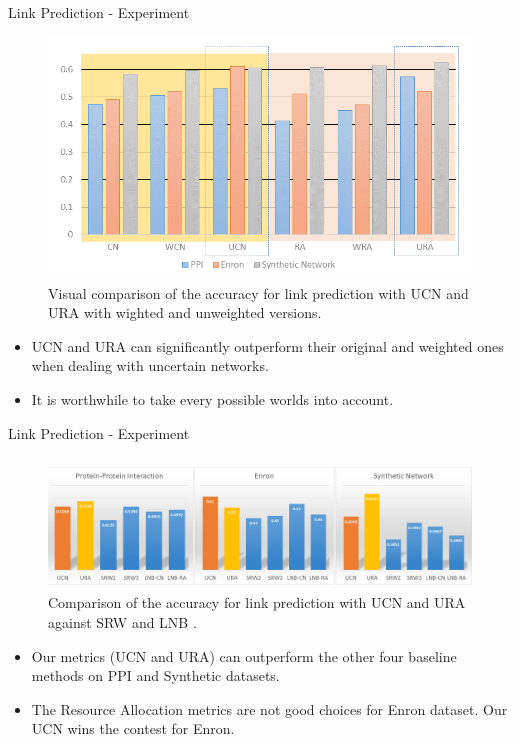 \documentclass[9pt]{beamer}
\begin{document}
\begin{frame}{Link Prediction - Experiment}

\begin{figure}
\centering
\includegraphics[scale = 0.8]{Result-Fig1.png}
\caption{Visual comparison of the accuracy for link prediction with UCN and URA with wighted and unweighted versions.}
\label{example}
\end{figure}
\begin{itemize}
\item UCN and URA can significantly outperform their original and weighted ones when dealing with uncertain networks. 
\item It is worthwhile to take every possible worlds into account.
\end{itemize}

\end{frame}




\begin{frame}{Link Prediction - Experiment}

\begin{figure}
\centering
\includegraphics[scale = 0.6]{Results-Fig2.png}
\caption{Comparison of the accuracy for link prediction with UCN and URA against SRW \cite{liu2010link} and LNB \cite{liu2011link}.}
\label{example}
\end{figure}

\begin{itemize}
\item Our metrics (UCN and URA) can outperform the other four baseline methods on PPI and Synthetic datasets. 
\item The Resource Allocation metrics are not good choices for Enron dataset. Our UCN wins the contest for Enron.
\end{itemize}
\end{frame}
\end{document}
